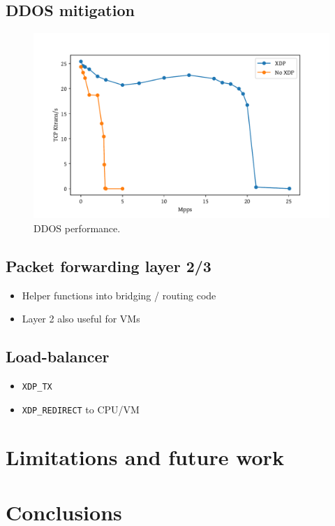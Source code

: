 \documentclass[10pt,sigconf]{acmart}
\begin{document}
\subsection{DDOS mitigation}
\label{sec:org5f83e1d}
\begin{figure}[t]
\centering
\includegraphics[width=\linewidth]{figures/ddos-test.pdf}
\caption{\label{fig:ddos-results} DDOS performance.}
\end{figure}
\subsection{Packet forwarding layer 2/3}
\label{sec:org3681460}
\begin{itemize}
\item Helper functions into bridging / routing code
\item Layer 2 also useful for VMs
\end{itemize}
\subsection{Load-balancer}
\label{sec:org685e28c}
\begin{itemize}
\item \texttt{XDP\_TX}
\item \texttt{XDP\_REDIRECT} to CPU/VM
\end{itemize}

\section{Limitations and future work}
\label{sec:limitations}


\section{Conclusions}
\label{sec:conclusion}







\end{document}
